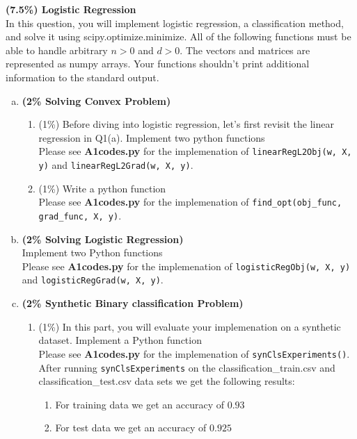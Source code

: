 \documentclass[12pt]{article}
\newcounter{ques}
\newenvironment{question}{\stepcounter{ques}{\noindent\bf Question \arabic{ques}:}}{\vspace{5mm}}
\begin{document}
\begin{question} \textbf{(7.5\%) Logistic Regression}\\
In this question, you will implement logistic regression, a classification method, and
solve it using scipy.optimize.minimize.
All of the following functions must be able to handle arbitrary $n > 0$ and $d > 0$.
The vectors and matrices are represented as numpy arrays. Your functions shouldn't
print additional information to the standard output. \\
\begin{enumerate}[(a)]
  \item \textbf{(2\% Solving Convex Problem)}
  \begin{enumerate}[(a.1)]
    \item (1\%) Before diving into logistic regression, let's first revisit the linear regression in Q1(a). Implement two python functions \\
    Please see \textbf{A1codes.py} for the implemenation of \texttt{linearRegL2Obj(w, X, y)} and \texttt{linearRegL2Grad(w, X, y)}.
    \item (1\%) Write a python function \\
    Please see \textbf{A1codes.py} for the implemenation of \texttt{find\_opt(obj\_func, grad\_func, X, y)}.
  \end{enumerate}
  \item \textbf{(2\% Solving Logistic Regression)} \\
  Implement two Python functions \\
  Please see \textbf{A1codes.py} for the implemenation of \texttt{logisticRegObj(w, X, y)} and \texttt{logisticRegGrad(w, X, y)}.
  \item \textbf{(2\% Synthetic Binary classification Problem)}
  \begin{enumerate} [(c.1)]
    \item (1\%) In this part, you will evaluate your implemenation on a synthetic dataset. Implement a Python function \\
    Please see \textbf{A1codes.py} for the implemenation of \texttt{synClsExperiments()}. \\[0.5em]
    After running \texttt{synClsExperiments} on the classification\_train.csv and classification\_test.csv data sets we get the following results:
    \begin{enumerate}[$\cdot$]
      \item For training data we get an accuracy of $0.93$
      \item For test data we get an accuracy of $0.925$

\end{enumerate}
\end{enumerate}
\end{enumerate}
\end{question}
\end{document}
